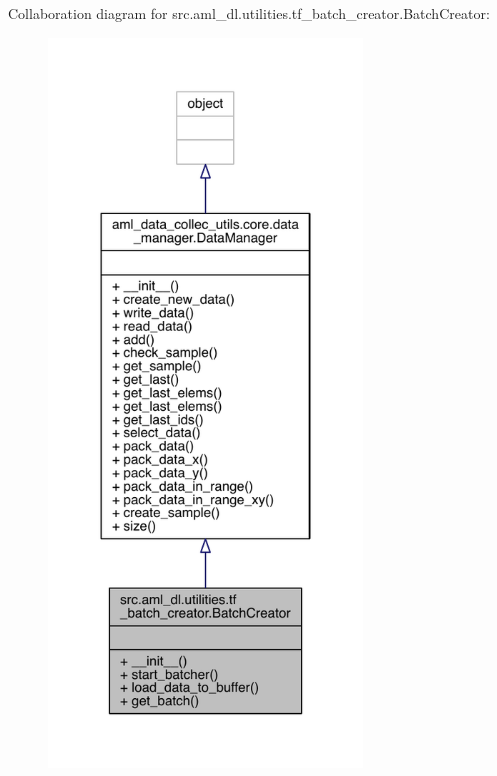 Collaboration diagram for src.\+aml\+\_\+dl.\+utilities.\+tf\+\_\+batch\+\_\+creator.\+Batch\+Creator\+:\nopagebreak
\begin{figure}[H]
\begin{center}
\leavevmode
\includegraphics[width=236pt]{classsrc_1_1aml__dl_1_1utilities_1_1tf__batch__creator_1_1_batch_creator__coll__graph}
\end{center}
\end{figure}

